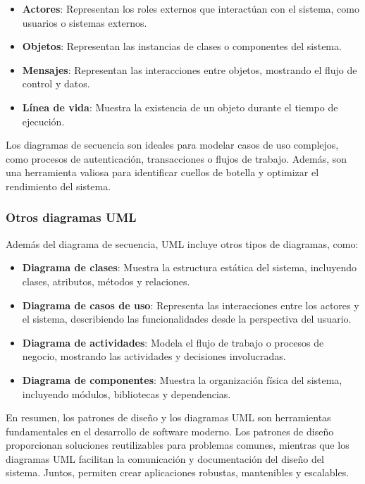 \documentclass[draft]{scrbook}
\begin{document}
\begin{itemize}
    \item \textbf{Actores}: Representan los roles externos que interactúan con el sistema, como usuarios o sistemas externos.
    \item \textbf{Objetos}: Representan las instancias de clases o componentes del sistema.
    \item \textbf{Mensajes}: Representan las interacciones entre objetos, mostrando el flujo de control y datos.
    \item \textbf{Línea de vida}: Muestra la existencia de un objeto durante el tiempo de ejecución.
\end{itemize}

Los diagramas de secuencia son ideales para modelar casos de uso complejos, como procesos de autenticación, transacciones o flujos de trabajo. Además, son una herramienta valiosa para identificar cuellos de botella y optimizar el rendimiento del sistema.

\subsubsection{Otros diagramas UML}
Además del diagrama de secuencia, UML incluye otros tipos de diagramas, como:
\begin{itemize}
    \item \textbf{Diagrama de clases}: Muestra la estructura estática del sistema, incluyendo clases, atributos, métodos y relaciones.
    \item \textbf{Diagrama de casos de uso}: Representa las interacciones entre los actores y el sistema, describiendo las funcionalidades desde la perspectiva del usuario.
    \item \textbf{Diagrama de actividades}: Modela el flujo de trabajo o procesos de negocio, mostrando las actividades y decisiones involucradas.
    \item \textbf{Diagrama de componentes}: Muestra la organización física del sistema, incluyendo módulos, bibliotecas y dependencias.
\end{itemize}

En resumen, los patrones de diseño y los diagramas UML son herramientas fundamentales en el desarrollo de software moderno. Los patrones de diseño proporcionan soluciones reutilizables para problemas comunes, mientras que los diagramas UML facilitan la comunicación y documentación del diseño del sistema. Juntos, permiten crear aplicaciones robustas, mantenibles y escalables.
\end{document}
